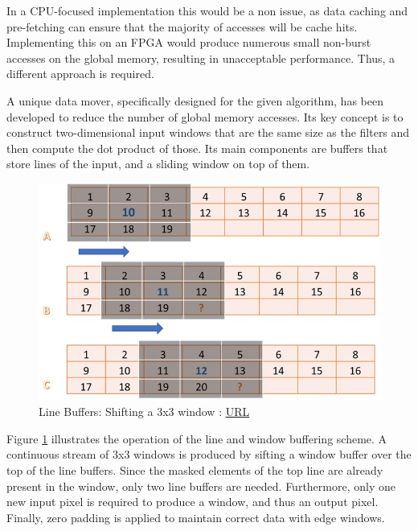 In a CPU-focused implementation this would be a non issue, as data caching and pre-fetching can ensure that the majority of accesses will be cache hits. Implementing this on an FPGA would produce numerous small non-burst accesses on the global memory, resulting in unacceptable performance. Thus, a different approach is required.

A unique data mover, specifically designed for the given algorithm, has been developed to reduce the number of global memory accesses. Its key concept is to construct two-dimensional input windows that are the same size as the filters and then compute the dot product of those. Its main components are buffers that store lines of the input, and a sliding window on top of them.

\begin{figure}[H]
    \centering
        \includegraphics[width=1\textwidth]{Images/diagrams/line_buf_conv.jpg}
        \decoRule
        \caption[Line Buffers, Convolution]{Line Buffers: Shifting a 3x3 window \cite{vitis_tutorials}: \href{https://github.com/Xilinx/Vitis-Tutorials/blob/2022.1/Hardware_Acceleration/Design_Tutorials/01-convolution-tutorial/lab2_conv_filter_kernel_design.md}{URL} }
        \label{fig: Line Buffers Convolution}
\end{figure}

Figure \ref{fig: Line Buffers Convolution} illustrates the operation of the line and window buffering scheme. A continuous stream of 3x3 windows is produced by sifting a window buffer over the top of the line buffers. Since the masked elements of the top line are already present in the window, only two line buffers are needed. Furthermore, only one new input pixel is required to produce a window, and thus an output pixel. Finally, zero padding is applied to maintain correct data with edge windows.

